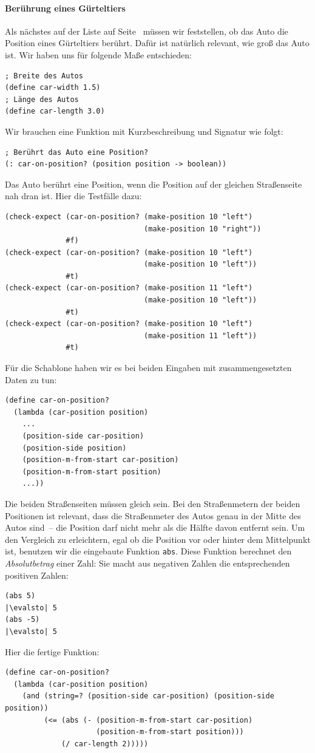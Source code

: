 \paragraph{Berührung eines Gürteltiers} Als nächstes auf der Liste auf
Seite~\pageref{page:dillo-world-todos} müssen wir feststellen, ob das
Auto die Position eines Gürteltiers berührt.  Dafür ist natürlich
relevant, wie groß das Auto ist.  Wir haben uns für folgende Maße
entschieden:
%
\begin{lstlisting}
; Breite des Autos
(define car-width 1.5)
; Länge des Autos
(define car-length 3.0)
\end{lstlisting}
%
Wir brauchen eine Funktion mit Kurzbeschreibung und Signatur wie
folgt:
%
\begin{lstlisting}
; Berührt das Auto eine Position?
(: car-on-position? (position position -> boolean))
\end{lstlisting}
%
Das Auto berührt eine Position, wenn die Position auf der gleichen
Straßenseite nah dran ist.  Hier die Testfälle dazu:
%
\begin{lstlisting}
(check-expect (car-on-position? (make-position 10 "left")
                                (make-position 10 "right"))
              #f)
(check-expect (car-on-position? (make-position 10 "left")
                                (make-position 10 "left"))
              #t)
(check-expect (car-on-position? (make-position 11 "left")
                                (make-position 10 "left"))
              #t)
(check-expect (car-on-position? (make-position 10 "left")
                                (make-position 11 "left"))
              #t)
\end{lstlisting}
%
Für die Schablone haben wir es bei beiden Eingaben mit
zusammengesetzten Daten zu tun:
%
\begin{lstlisting}
(define car-on-position?
  (lambda (car-position position)
    ...
    (position-side car-position) 
    (position-side position)
    (position-m-from-start car-position)
    (position-m-from-start position)
    ...))
\end{lstlisting}
%
Die beiden Straßenseiten müssen gleich sein.  Bei den Straßenmetern
der beiden Positionen ist relevant, dass die Straßenmeter des Autos
genau in der Mitte des Autos sind~-- die Position darf nicht mehr als
die Hälfte davon entfernt sein.  Um den Vergleich zu erleichtern, egal
ob die Position vor oder hinter dem Mittelpunkt ist, benutzen wir die
eingebaute Funktion \lstinline{abs}.  Diese
Funktion berechnet den \textit{Absolutbetrag}
einer Zahl: Sie macht aus negativen Zahlen die entsprechenden
positiven Zahlen:
%
\begin{lstlisting}
(abs 5)
|\evalsto| 5
(abs -5)
|\evalsto| 5
\end{lstlisting}
%
Hier die fertige Funktion:
%
\begin{lstlisting}
(define car-on-position?
  (lambda (car-position position)
    (and (string=? (position-side car-position) (position-side position))
         (<= (abs (- (position-m-from-start car-position)
                     (position-m-from-start position)))
             (/ car-length 2)))))
\end{lstlisting}

